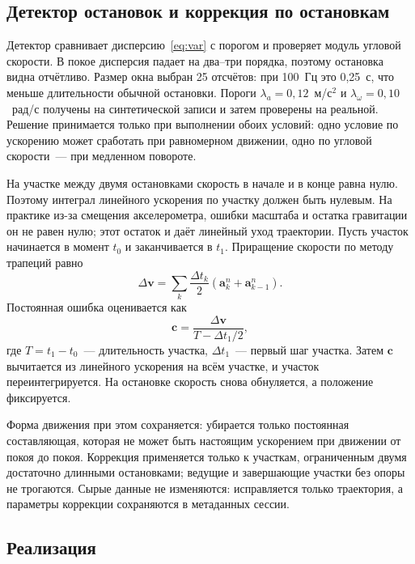 \documentclass{misisarticle}
\begin{document}
\subsection{Детектор остановок и коррекция по остановкам}

Детектор сравнивает дисперсию~\eqref{eq:var} с порогом и проверяет модуль угловой скорости. В покое дисперсия падает на два--три порядка, поэтому остановка видна отчётливо. Размер окна выбран 25 отсчётов: при 100~Гц это 0,25~с, что меньше длительности обычной остановки. Пороги $\lambda_a=0{,}12$~м/с$^2$ и $\lambda_\omega=0{,}10$~рад/с получены на синтетической записи и затем проверены на реальной. Решение принимается только при выполнении обоих условий: одно условие по ускорению может сработать при равномерном движении, одно по угловой скорости~--- при медленном повороте.

На участке между двумя остановками скорость в начале и в конце равна нулю. Поэтому интеграл линейного ускорения по участку должен быть нулевым. На практике из-за смещения акселерометра, ошибки масштаба и остатка гравитации он не равен нулю; этот остаток и даёт линейный уход траектории. Пусть участок начинается в момент $t_0$ и заканчивается в $t_1$. Приращение скорости по методу трапеций равно
\begin{equation}
\Delta\mathbf v=\sum_{k}\frac{\Delta t_k}{2}\left(\mathbf a_k^{n}+\mathbf a_{k-1}^{n}\right).
\label{eq:dv}
\end{equation}
Постоянная ошибка оценивается как
\begin{equation}
\mathbf c=\frac{\Delta\mathbf v}{T-\Delta t_1/2},
\label{eq:corr}
\end{equation}
где $T=t_1-t_0$~--- длительность участка, $\Delta t_1$~--- первый шаг участка. Затем $\mathbf c$ вычитается из линейного ускорения на всём участке, и участок переинтегрируется. На остановке скорость снова обнуляется, а положение фиксируется.

Форма движения при этом сохраняется: убирается только постоянная составляющая, которая не может быть настоящим ускорением при движении от покоя до покоя. Коррекция применяется только к участкам, ограниченным двумя достаточно длинными остановками; ведущие и завершающие участки без опоры не трогаются. Сырые данные не изменяются: исправляется только траектория, а параметры коррекции сохраняются в метаданных сессии.

\subsection{Реализация}
\end{document}
